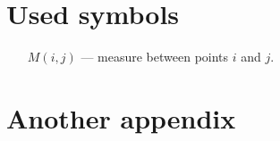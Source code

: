 \chapter{Used symbols}
\label{app:symbols}

\begin{itemize}
\item[$M(i,j)$] --- measure between points $i$ and $j$.
\end{itemize}


\chapter{Another appendix}
\label{app:appendix}